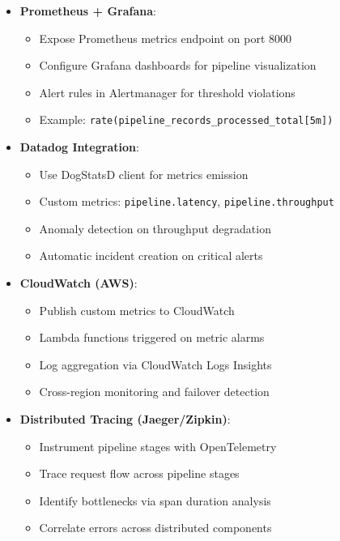 \begin{itemize}
    \item \textbf{Prometheus + Grafana}:
    \begin{itemize}
        \item Expose Prometheus metrics endpoint on port 8000
        \item Configure Grafana dashboards for pipeline visualization
        \item Alert rules in Alertmanager for threshold violations
        \item Example: \texttt{rate(pipeline\_records\_processed\_total[5m])}
    \end{itemize}

    \item \textbf{Datadog Integration}:
    \begin{itemize}
        \item Use DogStatsD client for metrics emission
        \item Custom metrics: \texttt{pipeline.latency}, \texttt{pipeline.throughput}
        \item Anomaly detection on throughput degradation
        \item Automatic incident creation on critical alerts
    \end{itemize}

    \item \textbf{CloudWatch (AWS)}:
    \begin{itemize}
        \item Publish custom metrics to CloudWatch
        \item Lambda functions triggered on metric alarms
        \item Log aggregation via CloudWatch Logs Insights
        \item Cross-region monitoring and failover detection
    \end{itemize}

    \item \textbf{Distributed Tracing (Jaeger/Zipkin)}:
    \begin{itemize}
        \item Instrument pipeline stages with OpenTelemetry
        \item Trace request flow across pipeline stages
        \item Identify bottlenecks via span duration analysis
        \item Correlate errors across distributed components
    \end{itemize}
\end{itemize}

